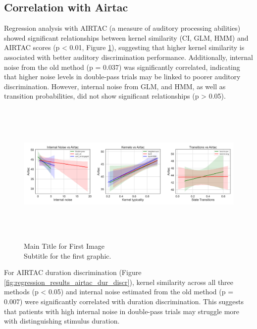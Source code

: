 \subsection {Correlation with Airtac} 
Regression analysis with AIRTAC (a measure of auditory processing abilities) showed significant relationships between kernel similarity (CI, GLM, HMM) and AIRTAC scores (p < 0.01, Figure \ref{fig:regression_results_airtac}), suggesting that higher kernel similarity is associated with better auditory discrimination performance. Additionally, internal noise from the old method (p = 0.037) was significantly correlated, indicating that higher noise levels in double-pass trials may be linked to poorer auditory discrimination. However, internal noise from GLM, and HMM, as well as transition probabilities, did not show significant relationships (p > 0.05).
\begin{figure}[H]
    \centering
    \includegraphics[width=17cm,height=7cm]{MainLayout/Images/chapter8/regression_results_airtac.jpg}
    \caption{Main Title for First Image \\ \small Subtitle for the first graphic.}
    \label{fig:regression_results_airtac}
\end{figure}
For AIRTAC duration discrimination (Figure \ref{fig:regression_results_airtac_dur_discr}), kernel similarity across all three methods (p < 0.05) and internal noise estimated from the old method (p = 0.007) were significantly correlated with duration discrimination. This suggests that patients with high internal noise in double-pass trials may struggle more with distinguishing stimulus duration.
